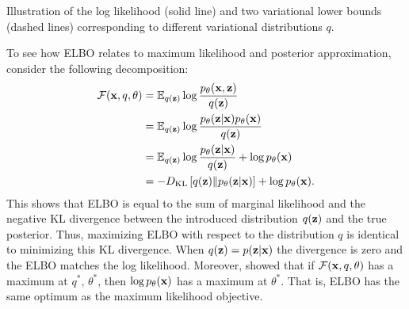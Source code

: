 \begin{marginfigure}[1\baselineskip]
\caption{Illustration of the log likelihood (solid line) and two variational lower bounds (dashed lines) corresponding to different variational distributions $q$.}\label{fig:intro_bound}
\end{marginfigure}

To see how ELBO relates to maximum likelihood and posterior approximation,  consider the following decomposition:
\begin{equation}
\begin{aligned}
    \mathcal{F}({\mathbf{x}}, q, \theta) &= \mathbb{E}_{q({\mathbf{z}})}\log  \frac{p_{\theta}({\mathbf{x}},{\mathbf{z}})}{q({\mathbf{z}})} \\
    & = \mathbb{E}_{q({\mathbf{z}})}\log  \frac{p_{\theta}({\mathbf{z}}|{\mathbf{x}})p_{\theta}({\mathbf{x}})}{q({\mathbf{z}})} \\
    & = \mathbb{E}_{q({\mathbf{z}})}\log  \frac{p_{\theta}({\mathbf{z}}|{\mathbf{x}})}{q({\mathbf{z}})} +  \log p_{\theta}({\mathbf{x}})\\
    & = - D_{\mathrm{KL}}\left[q({\mathbf{z}})\|p_{\theta}({\mathbf{z}}|{\mathbf{x}})\right] + \log p_{\theta}({\mathbf{x}}).\\
\end{aligned}
\end{equation}
This shows that ELBO is equal to the sum of marginal likelihood and the negative KL divergence between the introduced distribution $q({\mathbf{z}})$ and the true posterior.
Thus,  maximizing ELBO with respect to the distribution $q$ is identical to minimizing this KL divergence. When $q({\mathbf{z}}) = p({\mathbf{z}}|{\mathbf{x}})$ the divergence is zero and the ELBO matches the log likelihood.
Moreover, \citet{neal1998view} showed that if $\mathcal{F}({\mathbf{x}}, q, \theta) $ has a maximum at $q^*, \, \theta^*$, then $\log p_{\theta}({\mathbf{x}})$ has a maximum at $\theta^*$. That is, ELBO has the same optimum as the maximum likelihood objective. 

